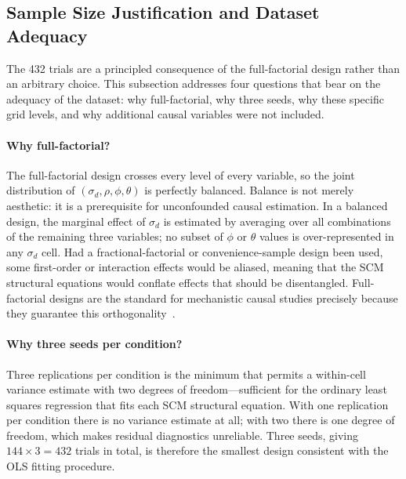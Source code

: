 \documentclass[11pt,a4paper]{report}
\begin{document}
\subsection{Sample Size Justification and Dataset Adequacy}
\label{sec:sample_size}

The 432 trials are a principled consequence of the full-factorial design rather than an arbitrary choice. This subsection addresses four questions that bear on the adequacy of the dataset: why full-factorial, why three seeds, why these specific grid levels, and why additional causal variables were not included.

\paragraph{Why full-factorial?}
The full-factorial design crosses every level of every variable, so the joint distribution of $(\sigma_d, \rho, \phi, \theta)$ is perfectly balanced. Balance is not merely aesthetic: it is a prerequisite for unconfounded causal estimation. In a balanced design, the marginal effect of $\sigma_d$ is estimated by averaging over all combinations of the remaining three variables; no subset of $\phi$ or $\theta$ values is over-represented in any $\sigma_d$ cell. Had a fractional-factorial or convenience-sample design been used, some first-order or interaction effects would be aliased, meaning that the SCM structural equations would conflate effects that should be disentangled. Full-factorial designs are the standard for mechanistic causal studies precisely because they guarantee this orthogonality~\cite{montgomery2017design}.

\paragraph{Why three seeds per condition?}
Three replications per condition is the minimum that permits a within-cell variance estimate with two degrees of freedom---sufficient for the ordinary least squares regression that fits each SCM structural equation. With one replication per condition there is no variance estimate at all; with two there is one degree of freedom, which makes residual diagnostics unreliable. Three seeds, giving $144 \times 3 = 432$ trials in total, is therefore the smallest design consistent with the OLS fitting procedure.
\end{document}
